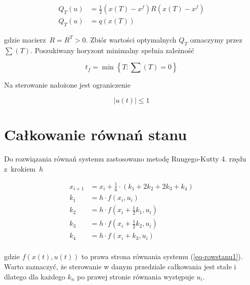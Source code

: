 \documentclass[11pt]{mwart}
\begin{document}
\begin{equation}
	\label{eq-wskjakosci}
	\begin{split}
		Q_{T}\left(u\right) &= \frac{1}{2}\left(x\left(T\right)-x^f\right)R\left(x\left(T\right)-x^f\right) \\
		Q_{T}\left(u\right) &= q\left(x\left(T\right)\right)
	\end{split}
\end{equation}

gdzie macierz~$R=R^T>0$. Zbiór wartości optymalnych $Q_T$ oznaczymy przez~$\sum\left(T\right)$. Poszukiwany horyzont minimalny spełnia zależność

\begin{equation}
	t_{f}=\min\left\{T:\sum\left(T\right)=0\right\}
\end{equation}

Na sterowanie nałożone jest ograniczenie 

\begin{equation}
	\left|u\left(t\right)\right|\leq 1
\end{equation}

\newpage{}

\section{Całkowanie równań stanu}

Do rozwiązania równań systemu zastosowano metodę Rungego-Kutty 4. rzędu z~krokiem~$h$

\begin{equation}
	\begin{split}
		x_{i+1} &= x_{i} + \frac{1}{6}\cdot\left(k_{1}+2k_{2}+2k_{3}+k_{4}\right) \\
		k_{1} &= h\cdot f\left(x_{i},u_{i}\right) \\
		k_{2} &= h\cdot f\left(x_{i}+\frac{1}{2}k_{1},u_{i}\right) \\
		k_{3} &= h\cdot f\left(x_{i}+\frac{1}{2}k_{2},u_{i}\right) \\
		k_{4} &= h\cdot f\left(x_{i}+k_{3},u_{i}\right) \\
	\end{split}
\end{equation}


gdzie $f\left(x\left(t\right),u\left(t\right)\right)$ to prawa strona równania systemu (\ref{eq-rowstanu1}). Warto zaznaczyć, że sterowanie w danym przedziale całkowania jest stałe i dlatego dla każdego $k_{n}$ po prawej stronie równania występuje $u_{i}$.
\end{document}
